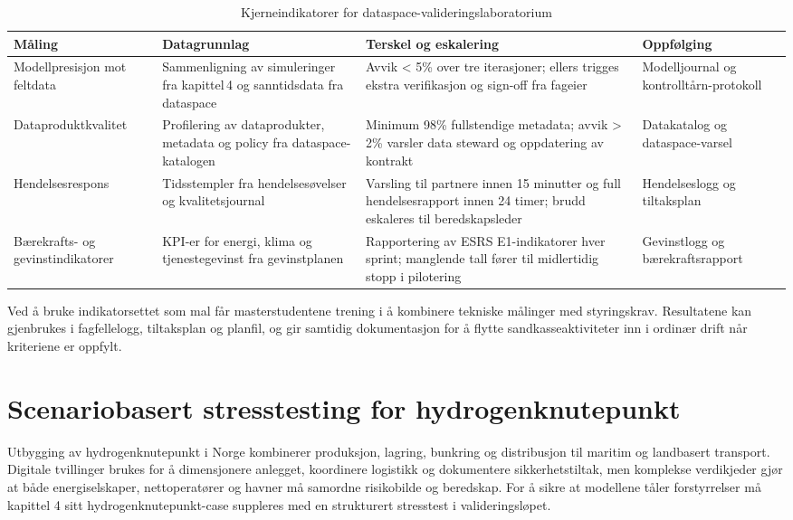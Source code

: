 \begin{table}[ht]
    \centering
    \caption{Kjerneindikatorer for dataspace-valideringslaboratorium}
    \label{tab:dataspaceindikatorer}
    \begin{tabular}{|p{3.2cm}|p{4.8cm}|p{4.2cm}|p{3.2cm}|}
        \hline
        \textbf{Måling} & \textbf{Datagrunnlag} & \textbf{Terskel og eskalering} & \textbf{Oppfølging} \\
        \hline
        Modellpresisjon mot feltdata & Sammenligning av simuleringer fra kapittel\,4 og sanntidsdata fra dataspace & Avvik \textless{} 5\% over tre iterasjoner; ellers trigges ekstra verifikasjon og sign-off fra fageier & Modelljournal og kontrolltårn-protokoll \\
        \hline
        Dataproduktkvalitet & Profilering av dataprodukter, metadata og policy fra dataspace-katalogen & Minimum 98\% fullstendige metadata; avvik \textgreater{} 2\% varsler data steward og oppdatering av kontrakt & Datakatalog og dataspace-varsel \\
        \hline
        Hendelsesrespons & Tidsstempler fra hendelsesøvelser og kvalitetsjournal & Varsling til partnere innen 15 minutter og full hendelsesrapport innen 24 timer; brudd eskaleres til beredskapsleder & Hendelseslogg og tiltaksplan \\
        \hline
        Bærekrafts- og gevinstindikatorer & KPI-er for energi, klima og tjenestegevinst fra gevinstplanen & Rapportering av ESRS E1-indikatorer hver sprint; manglende tall fører til midlertidig stopp i pilotering & Gevinstlogg og bærekraftsrapport \\
        \hline
    \end{tabular}
\end{table}

Ved å bruke indikatorsettet som mal får masterstudentene trening i å kombinere tekniske målinger med styringskrav. Resultatene kan gjenbrukes i fagfellelogg, tiltaksplan og planfil, og gir samtidig dokumentasjon for å flytte sandkasseaktiviteter inn i ordinær drift når kriteriene er oppfylt.

\section{Scenariobasert stresstesting for hydrogenknutepunkt}
Utbygging av hydrogenknutepunkt i Norge kombinerer produksjon, lagring, bunkring og distribusjon til maritim og landbasert transport.\citep{enova2024hydrogenknutepunkt} Digitale tvillinger brukes for å dimensjonere anlegget, koordinere logistikk og dokumentere sikkerhetstiltak, men komplekse verdikjeder gjør at både energiselskaper, nettoperatører og havner må samordne risikobilde og beredskap.\citep{gassco2023hydrogen,dnv2023hydrogenforecast} For å sikre at modellene tåler forstyrrelser må kapittel 4 sitt hydrogenknutepunkt-case suppleres med en strukturert stresstest i valideringsløpet.

